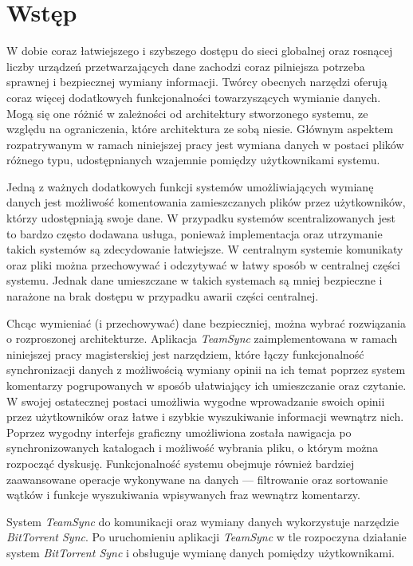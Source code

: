 \chapter{Wstęp}

W dobie coraz łatwiejszego i szybszego dostępu do sieci globalnej oraz rosnącej liczby urządzeń przetwarzających dane zachodzi coraz pilniejsza potrzeba sprawnej i bezpiecznej wymiany informacji. Twórcy obecnych narzędzi oferują coraz więcej dodatkowych funkcjonalności towarzyszących wymianie danych. Mogą się one różnić w zależności od architektury stworzonego systemu, ze względu na ograniczenia, które architektura ze sobą niesie. Głównym aspektem rozpatrywanym w ramach niniejszej pracy jest wymiana danych w postaci plików różnego typu, udostępnianych wzajemnie pomiędzy użytkownikami systemu.

Jedną z ważnych dodatkowych funkcji systemów umożliwiających wymianę danych jest możliwość komentowania zamieszczanych plików przez użytkowników, którzy udostępniają swoje dane. W przypadku systemów scentralizowanych jest to bardzo często dodawana usługa, ponieważ implementacja oraz utrzymanie takich systemów są zdecydowanie łatwiejsze. W centralnym systemie komunikaty oraz pliki można przechowywać i odczytywać w łatwy sposób w centralnej części systemu. Jednak dane umieszczane w takich systemach są mniej bezpieczne i narażone na brak dostępu w przypadku awarii części centralnej.

Chcąc wymieniać (i przechowywać) dane bezpieczniej, można wybrać rozwiązania o rozproszonej architekturze. Aplikacja \emph{TeamSync} zaimplementowana w ramach niniejszej pracy magisterskiej jest narzędziem, które łączy funkcjonalność synchronizacji danych z możliwością wymiany opinii na ich temat poprzez system komentarzy pogrupowanych w sposób ułatwiający ich umieszczanie oraz czytanie. W swojej ostatecznej postaci umożliwia wygodne wprowadzanie swoich opinii przez użytkowników oraz łatwe i szybkie wyszukiwanie informacji wewnątrz nich. Poprzez wygodny interfejs graficzny umożliwiona została nawigacja po synchronizowanych katalogach i możliwość wybrania pliku, o którym można rozpocząć dyskusję. Funkcjonalność systemu obejmuje również bardziej zaawansowane operacje wykonywane na danych --- filtrowanie oraz sortowanie wątków i funkcje wyszukiwania wpisywanych fraz wewnątrz komentarzy.

System \emph{TeamSync} do komunikacji oraz wymiany danych wykorzystuje narzędzie \emph{BitTorrent Sync}. Po uruchomieniu aplikacji \emph{TeamSync} w tle rozpoczyna działanie system \emph{BitTorrent Sync} i obsługuje wymianę danych pomiędzy użytkownikami.


